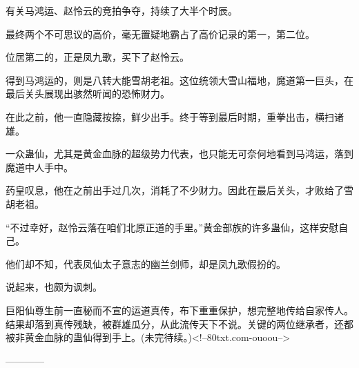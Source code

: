 \begin{this_body}
有关马鸿运、赵怜云的竞拍争夺，持续了大半个时辰。

最终两个不可思议的高价，毫无置疑地霸占了高价记录的第一，第二位。

位居第二的，正是凤九歌，买下了赵怜云。

得到马鸿运的，则是八转大能雪胡老祖。这位统领大雪山福地，魔道第一巨头，在最后关头展现出骇然听闻的恐怖财力。

在此之前，他一直隐藏按捺，鲜少出手。终于等到最后时期，重拳出击，横扫诸雄。

一众蛊仙，尤其是黄金血脉的超级势力代表，也只能无可奈何地看到马鸿运，落到魔道中人手中。

药皇叹息，他在之前出手过几次，消耗了不少财力。因此在最后关头，才败给了雪胡老祖。

“不过幸好，赵怜云落在咱们北原正道的手里。”黄金部族的许多蛊仙，这样安慰自己。

他们却不知，代表凤仙太子意志的幽兰剑师，却是凤九歌假扮的。

说起来，也颇为讽刺。

巨阳仙尊生前一直秘而不宣的运道真传，布下重重保护，想完整地传给自家传人。结果却落到真传残缺，被群雄瓜分，从此流传天下不说。关键的两位继承者，还都被非黄金血脉的蛊仙得到手上。(未完待续。)<!--80txt.com-ouoou-->

------------

\end{this_body}

